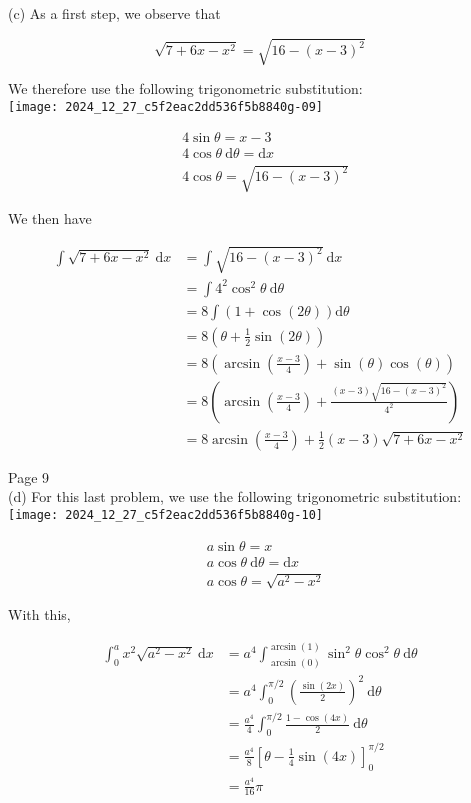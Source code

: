 \documentclass[10pt]{article}
\begin{document}
(c) As a first step, we observe that

$$
\sqrt{7+6 x-x^{2}}=\sqrt{16-(x-3)^{2}}
$$

We therefore use the following trigonometric substitution:\\
\texttt{[image: 2024\_12\_27\_c5f2eac2dd536f5b8840g-09]}

$$
\begin{aligned}
& 4 \sin \theta=x-3 \\
& 4 \cos \theta \mathrm{~d} \theta=\mathrm{d} x \\
& 4 \cos \theta=\sqrt{16-(x-3)^{2}}
\end{aligned}
$$

We then have

$$
\begin{aligned}
\int \sqrt{7+6 x-x^{2}} \mathrm{~d} x & =\int \sqrt{16-(x-3)^{2}} \mathrm{~d} x \\
& =\int 4^{2} \cos ^{2} \theta \mathrm{~d} \theta \\
& =8 \int(1+\cos (2 \theta)) \mathrm{d} \theta \\
& =8\left(\theta+\frac{1}{2} \sin (2 \theta)\right) \\
& =8\left(\arcsin \left(\frac{x-3}{4}\right)+\sin (\theta) \cos (\theta)\right) \\
& =8\left(\arcsin \left(\frac{x-3}{4}\right)+\frac{(x-3) \sqrt{16-(x-3)^{2}}}{4^{2}}\right) \\
& =8 \arcsin \left(\frac{x-3}{4}\right)+\frac{1}{2}(x-3) \sqrt{7+6 x-x^{2}}
\end{aligned}
$$

Page 9\\
(d) For this last problem, we use the following trigonometric substitution:\\
\texttt{[image: 2024\_12\_27\_c5f2eac2dd536f5b8840g-10]}

$$
\begin{aligned}
& a \sin \theta=x \\
& a \cos \theta \mathrm{~d} \theta=\mathrm{d} x \\
& a \cos \theta=\sqrt{a^{2}-x^{2}}
\end{aligned}
$$

With this,

$$
\begin{aligned}
\int_{0}^{a} x^{2} \sqrt{a^{2}-x^{2}} \mathrm{~d} x & =a^{4} \int_{\arcsin (0)}^{\arcsin (1)} \sin ^{2} \theta \cos ^{2} \theta \mathrm{~d} \theta \\
& =a^{4} \int_{0}^{\pi / 2}\left(\frac{\sin (2 x)}{2}\right)^{2} \mathrm{~d} \theta \\
& =\frac{a^{4}}{4} \int_{0}^{\pi / 2} \frac{1-\cos (4 x)}{2} \mathrm{~d} \theta \\
& =\frac{a^{4}}{8}\left[\theta-\frac{1}{4} \sin (4 x)\right]_{0}^{\pi / 2} \\
& =\frac{a^{4}}{16} \pi
\end{aligned}
$$
\end{document}
